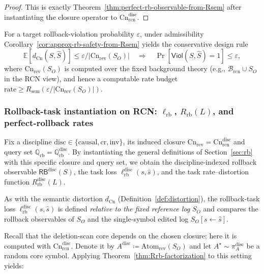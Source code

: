\documentclass[twoside]{article}
\newcommand{\Cn}{\mathrm{Cn}}
\newcommand{\Atom}{\mathrm{Atom}}
\newcommand{\sem}{\mathrm{sem}}
\newcommand{\E}{\mathbb{E}}
\newcommand{\1}{\mathbf{1}}
\begin{document}
\begin{proof}
This is exactly Theorem~\ref{thm:perfect-rb-observable-from-Rsem} after instantiating the closure operator to
\(\Cn^{\mathrm{disc}}_{\mathrm{rcn}}\).
\end{proof}

For a target rollback-violation probability \(\varepsilon\), under admissibility
Corollary~\ref{cor:approx-rb-safety-from-Rsem} yields the conservative design rule
\[
\E[d_{\Cn}(S,\hat S)]\le \varepsilon/|\Cn_{\mathrm{rev}}(S_O)|
\quad\Longrightarrow\quad
\Pr[\mathsf{Viol}(S,\hat S)=1]\le \varepsilon,
\]
where \(\Cn_{\mathrm{rev}}(S_O)\) is computed over the fixed background theory (e.g., \(\mathcal{B}_{\mathrm{rcn}}\cup S_O\) in the RCN view),
and hence a computable rate budget \(\text{rate}\ge R_{\sem}(\varepsilon/|\Cn_{\mathrm{rev}}(S_O)|)\).

\subsubsection{Rollback-task instantiation on RCN: \texorpdfstring{\(\ell_{\mathrm{rb}}\), \(R_{\mathrm{rb}}(L)\), and perfect-rollback rates}{ell\_rb, R\_rb(L), and perfect-rollback rates}}
\label{sec:rcn-rbtask-inst}

Fix a discipline \(\mathrm{disc}\in\{\mathrm{causal},\mathrm{cr},\mathrm{inv}\}\), its induced closure \(\Cn_{\mathrm{rev}}=\Cn^{\mathrm{disc}}_{\mathrm{rcn}}\) and query set \(\mathbb{Q}_{\mathrm{rb}}=\mathbb{Q}^{\mathrm{disc}}_{\mathrm{rb}}\). By instantiating the general definitions of Section~\ref{sec:rb} with this specific closure and query set, we obtain the discipline-indexed rollback observable \(\mathsf{RB}^{\mathrm{disc}}(S)\), the task loss \(\ell^{\mathrm{disc}}_{\mathrm{rb}}(s,\hat s)\), and the task rate--distortion function \(R^{\mathrm{disc}}_{\mathrm{rb}}(L)\).

As with the semantic distortion \(d_{\Cn}\) (Definition~\ref{def:distortion}), the rollback-task loss \(\ell^{\mathrm{disc}}_{\mathrm{rb}}(s,\hat s)\) is defined \emph{relative to the fixed reference log} \(S_O\) and compares the rollback observables of \(S_O\) and the single-symbol edited log \(S_O[s\leftarrow \hat s]\).

Recall that the deletion-scan core depends on the chosen closure; here it is computed
with \(\Cn^{\mathrm{disc}}_{\mathrm{rcn}}\).  Denote it by
\(A^{\mathrm{disc}}\coloneqq\Atom_{\mathrm{rev}}(S_O)\) and let
\(A^\star\sim\pi_A^{\mathrm{disc}}\) be a random core symbol.  Applying
Theorem~\ref{thm:Rrb-factorization} to this setting yields:
\end{document}
